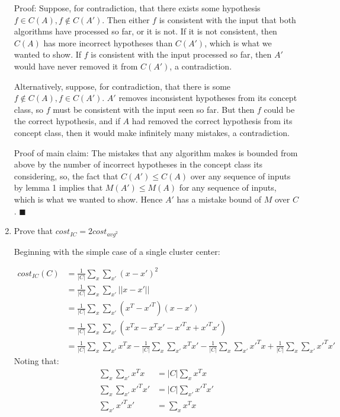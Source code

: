 \documentclass{article}
\begin{document}
\begin{enumerate}
Proof: Suppose, for contradiction, that there exists some hypothesis
$f \in C(A), f \not\in C(A')$. Then either $f$ is consistent with the
input that both algorithms have processed so far, or it is not. If it
is not consistent, then $C(A)$ has more incorrect hypotheses than
$C(A')$, which is what we wanted to show. If $f$ is consistent with
the input processed so far, then $A'$ would have never removed it from
$C(A')$, a contradiction.

Alternatively, suppose, for contradiction, that there is some $f
\not\in C(A), f \in C(A')$. $A'$ removes inconsistent hypotheses from
its concept class, so $f$ must be consistent with the input seen so
far. But then $f$ could be the correct hypothesis, and if $A$ had
removed the correct hypothesis from its concept class, then it would
make infinitely many mistakes, a contradiction.

Proof of main claim: The mistakes that any algorithm makes is bounded from
above by the number of incorrect hypotheses in the concept class its
considering, so, the fact that $C(A') \leq C(A)$ over any sequence of
inputs by lemma 1 implies that $M(A') \leq M(A)$ for any sequence of
inputs, which is what we wanted to show. Hence $A'$ has a mistake
bound of $M$ over $C$. $\blacksquare$

\item Prove that $cost_{IC} = 2cost_{avg^2}$

Beginning with the simple case of a single cluster center:

\begin{align*}
  cost_{IC}(C) &= \frac 1 {|C|} \sum\limits_{x} \sum\limits_{x'} (x - x')^2\\
  &= \frac 1 {|C|} \sum\limits_{x} \sum\limits_{x'} ||x - x'||\\
  &= \frac 1 {|C|} \sum\limits_{x} \sum\limits_{x'} (x^T - x'^T)(x - x')\\
  &= \frac 1 {|C|} \sum\limits_{x} \sum\limits_{x'} (x^Tx - x^Tx' - x'^Tx + x'^Tx')\\
  &= \frac 1 {|C|} \sum\limits_{x} \sum\limits_{x'} x^Tx -  \frac 1 {|C|} \sum\limits_{x} \sum\limits_{x'} x^Tx' -  \frac 1 {|C|} \sum\limits_{x} \sum\limits_{x'}x'^Tx +  \frac 1 {|C|} \sum\limits_{x} \sum\limits_{x'} x'^Tx'
\end{align*}
Noting that:
\begin{align*}
  \sum\limits_{x} \sum\limits_{x'} x^Tx &= |C| \sum\limits_{x} x^Tx\\
  \sum\limits_{x} \sum\limits_{x'} x'^Tx' &= |C| \sum\limits_{x'} x'^Tx'\\
  \sum\limits_{x'} x'^Tx' &= \sum\limits_{x} x^Tx\\
\end{align*}


\end{enumerate}
\end{document}

